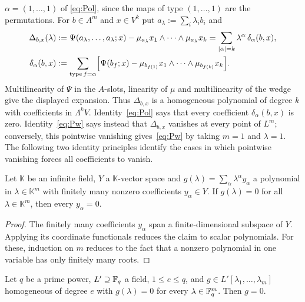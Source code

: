 $\alpha=(1,\dots,1)$ of \eqref{eq:Pol}, since the maps of type $(1,\dots,1)$ are the permutations. For $b\in A^m$ and
$x\in V^k$ put $a_\lambda:=\sum_i\lambda_ib_i$ and
\begin{align*}
\Delta_{b,x}(\lambda)&:=\Psi(a_\lambda,\dots,a_\lambda;x)-\mu_{a_\lambda}x_1\wedge\dots\wedge \mu_{a_\lambda}x_k
=\sum_{\lvert \alpha\rvert=k}\lambda^\alpha\,\delta_\alpha(b,x),\\
\delta_\alpha(b,x)&:=\sum_{\operatorname{type} f=\alpha}\Bigl[\Psi(b_f;x)-\mu_{b_{f(1)}}x_1\wedge\dots\wedge \mu_{b_{f(k)}}x_k\Bigr].
\end{align*}
Multilinearity of $\Psi$ in the $A$\nobreakdash-slots, linearity of $\mu$ and multilinearity of the wedge give the displayed
expansion. Thus $\Delta_{b,x}$ is a homogeneous polynomial of degree $k$ with coefficients in $\Lambda^kV$.
Identity~\eqref{eq:Pol} says that every coefficient $\delta_\alpha(b,x)$ is zero. Identity~\eqref{eq:Pw} says instead that
$\Delta_{b,x}$ vanishes at every point of $L^m$; conversely, this pointwise vanishing gives~\eqref{eq:Pw} by taking
$m=1$ and $\lambda=1$. The following two identity principles identify the cases in which pointwise vanishing forces
all coefficients to vanish.

\begin{lemma}\label{lem:idprinc}
Let $\mathbb K$ be an infinite field, $Y$ a $\mathbb K$\nobreakdash-vector space and $g(\lambda)=\sum_\alpha\lambda^\alpha y_\alpha$ a
polynomial in $\lambda\in\mathbb K^m$ with finitely many nonzero coefficients $y_\alpha\in Y$. If $g(\lambda)=0$ for all
$\lambda\in\mathbb K^m$, then every $y_\alpha=0$.
\end{lemma}

\begin{proof}
The finitely many coefficients $y_\alpha$ span a finite-dimensional subspace of $Y$. Applying its coordinate
functionals reduces the claim to scalar polynomials. For these, induction on $m$ reduces to the fact that a nonzero
polynomial in one variable has only finitely many roots.
\end{proof}

\begin{lemma}\label{lem:forms}
Let $q$ be a prime power, $L'\supseteq\mathbb F_q$ a field, $1\le e\le q$, and $g\in L'[\lambda_1,\dots,\lambda_m]$ homogeneous of
degree $e$ with $g(\lambda)=0$ for every $\lambda\in\mathbb F_q^m$. Then $g=0$.
\end{lemma}

